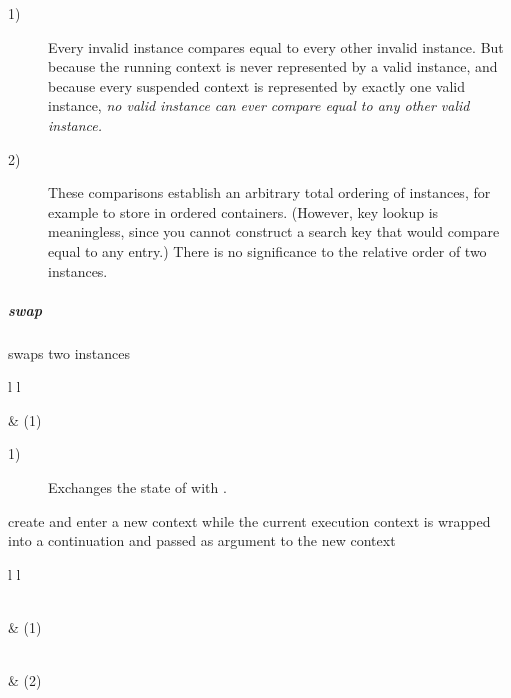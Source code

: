 \begin{description}
    \item[1)] Every invalid \cont instance compares equal to every other
              invalid instance. But because the running context is never
              represented by a valid \cont instance, and because every
              suspended context is represented by exactly one valid
              instance, \emph{no valid instance can ever compare equal to any
              other valid instance.}
    \item[2)] These comparisons establish an arbitrary total ordering of \cont
              instances, for example to store in ordered containers. (However,
              key lookup is meaningless, since you cannot construct a search
              key that would compare equal to any entry.) There is no
              significance to the relative order of two instances.
\end{description}

\subparagraph*{swap}
swaps two \cont instances\\

\begin{tabular}{ l l }
    \midrule

     & (1)\\

    \midrule
\end{tabular}

\begin{description}
    \item[1)] Exchanges the state of  with .\\
\end{description}



create and enter a new context while the current execution context is wrapped
into a continuation and passed as argument to the new context\\

\begin{tabular}{ l l }
    \midrule

    \\
     & (1)\\

    \midrule

    \\
     & (2)\\

    \midrule
\end{tabular}

